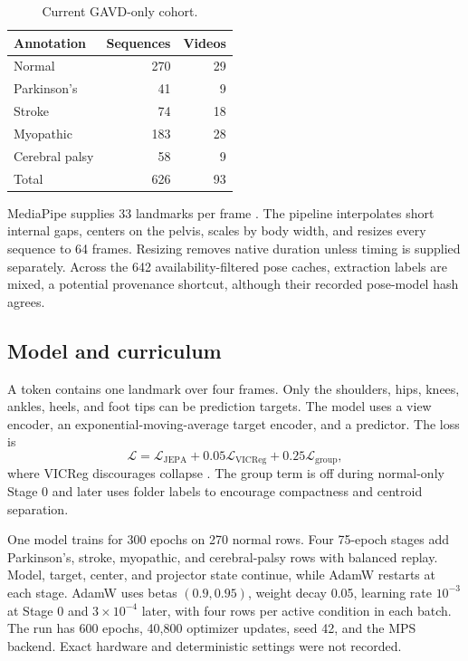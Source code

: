 \documentclass[10pt,twocolumn]{article}
\begin{document}
\begin{table}[t]
\centering
\small
\caption{Current GAVD-only cohort.}
\label{tab:data}
\begin{tabular}{lrr}
\toprule
Annotation & Sequences & Videos \\
\midrule
Normal & 270 & 29 \\
Parkinson's & 41 & 9 \\
Stroke & 74 & 18 \\
Myopathic & 183 & 28 \\
Cerebral palsy & 58 & 9 \\
\midrule
Total & 626 & 93 \\
\bottomrule
\end{tabular}
\end{table}

MediaPipe supplies 33 landmarks per frame \cite{grishchenko2022blazepose,mediapipePoseLandmarker}. The pipeline interpolates short internal gaps, centers on the pelvis, scales by body width, and resizes every sequence to 64 frames. Resizing removes native duration unless timing is supplied separately. Across the 642 availability-filtered pose caches, extraction labels are mixed, a potential provenance shortcut, although their recorded pose-model hash agrees.

\subsection{Model and curriculum}
A token contains one landmark over four frames. Only the shoulders, hips, knees, ankles, heels, and foot tips can be prediction targets. The model uses a view encoder, an exponential-moving-average target encoder, and a predictor. The loss is
\begin{equation}
\mathcal L=\mathcal L_{\mathrm{JEPA}}+0.05\mathcal L_{\mathrm{VICReg}}+0.25\mathcal L_{\mathrm{group}},
\end{equation}
where VICReg discourages collapse \cite{bardes2022vicreg}. The group term is off during normal-only Stage 0 and later uses folder labels to encourage compactness and centroid separation.

One model trains for 300 epochs on 270 normal rows. Four 75-epoch stages add Parkinson's, stroke, myopathic, and cerebral-palsy rows with balanced replay. Model, target, center, and projector state continue, while AdamW restarts at each stage. AdamW uses betas $(0.9,0.95)$, weight decay 0.05, learning rate $10^{-3}$ at Stage 0 and $3\times10^{-4}$ later, with four rows per active condition in each batch. The run has 600 epochs, 40,800 optimizer updates, seed 42, and the MPS backend. Exact hardware and deterministic settings were not recorded.
\end{document}
